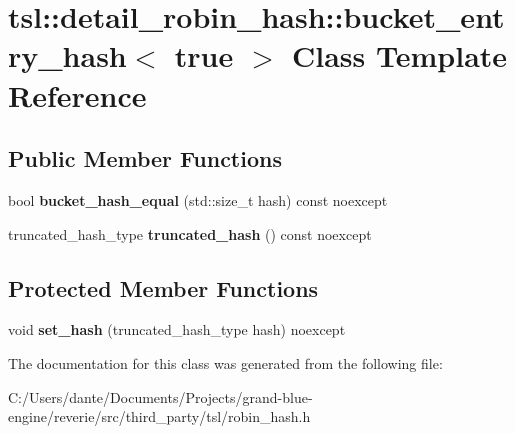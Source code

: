 \hypertarget{classtsl_1_1detail__robin__hash_1_1bucket__entry__hash_3_01true_01_4}{}\section{tsl\+::detail\+\_\+robin\+\_\+hash\+::bucket\+\_\+entry\+\_\+hash$<$ true $>$ Class Template Reference}
\label{classtsl_1_1detail__robin__hash_1_1bucket__entry__hash_3_01true_01_4}
\subsection*{Public Member Functions}
\begin{DoxyCompactItemize}
\item 
\mbox{\label{classtsl_1_1detail__robin__hash_1_1bucket__entry__hash_3_01true_01_4_a3c075a183e584be00ade9a88c69ac4a3}} 
bool {\bfseries bucket\+\_\+hash\+\_\+equal} (std\+::size\+\_\+t hash) const noexcept
\item 
\mbox{\label{classtsl_1_1detail__robin__hash_1_1bucket__entry__hash_3_01true_01_4_afcb0d8745cd742d1cbe85ea5e657ee92}} 
truncated\+\_\+hash\+\_\+type {\bfseries truncated\+\_\+hash} () const noexcept
\end{DoxyCompactItemize}
\subsection*{Protected Member Functions}
\begin{DoxyCompactItemize}
\item 
\mbox{\label{classtsl_1_1detail__robin__hash_1_1bucket__entry__hash_3_01true_01_4_ace7ccbf7d1fcaf26ea283bc1a4876092}} 
void {\bfseries set\+\_\+hash} (truncated\+\_\+hash\+\_\+type hash) noexcept
\end{DoxyCompactItemize}


The documentation for this class was generated from the following file\+:\begin{DoxyCompactItemize}
\item 
C\+:/\+Users/dante/\+Documents/\+Projects/grand-\/blue-\/engine/reverie/src/third\+\_\+party/tsl/robin\+\_\+hash.\+h\end{DoxyCompactItemize}
